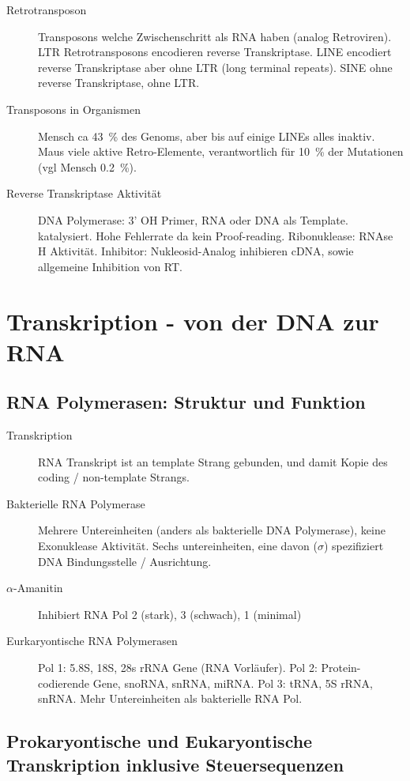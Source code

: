 \documentclass[a4paper,twocolumn,usegeometry,english,fontsize=5,DIV=28]{scrartcl}
\begin{document}
\begin{description}
	\item[Retrotransposon] Transposons welche Zwischenschritt als RNA haben
		(analog Retroviren). LTR Retrotransposons encodieren reverse
		Transkriptase. LINE encodiert reverse Transkriptase aber ohne
		LTR (long terminal repeats). SINE ohne reverse Transkriptase,
		ohne LTR.
	\item[Transposons in Organismen] Mensch ca \SI{43}{\percent} des
		Genoms, aber bis auf einige LINEs alles inaktiv. Maus viele
		aktive Retro-Elemente, verantwortlich für \SI{10}{\percent} der
		Mutationen (vgl Mensch \SI{0.2}{\percent}).
	\item[Reverse Transkriptase Aktivität] DNA Polymerase: 3' OH Primer,
		RNA oder DNA als Template.  katalysiert. Hohe
		Fehlerrate da kein Proof-reading. Ribonuklease: RNAse H
		Aktivität. Inhibitor: Nukleosid-Analog inhibieren cDNA, sowie
		allgemeine Inhibition von RT.
\end{description}

\section{Transkription - von der DNA zur RNA}

\subsection{RNA Polymerasen: Struktur und Funktion}

\begin{description}
	\item[Transkription] RNA Transkript ist an template Strang gebunden,
		und damit Kopie des coding / non-template Strangs. 
	\item[Bakterielle RNA Polymerase] Mehrere Untereinheiten (anders als
		bakterielle DNA Polymerase), keine Exonuklease Aktivität. Sechs
		untereinheiten, eine davon ($\sigma$) spezifiziert DNA
		Bindungsstelle / Ausrichtung.
	\item[$\alpha$-Amanitin] Inhibiert RNA Pol 2 (stark), 3 (schwach), 1
		(minimal)
	\item[Eurkaryontische RNA Polymerasen] Pol 1: 5.8S, 18S, 28s rRNA Gene
		(RNA Vorläufer). Pol 2: Protein-codierende Gene, snoRNA, snRNA,
		miRNA. Pol 3: tRNA, 5S rRNA, snRNA. Mehr Untereinheiten als
		bakterielle RNA Pol.
\end{description}

\subsection{Prokaryontische und Eukaryontische Transkription inklusive Steuersequenzen}
\end{document}

